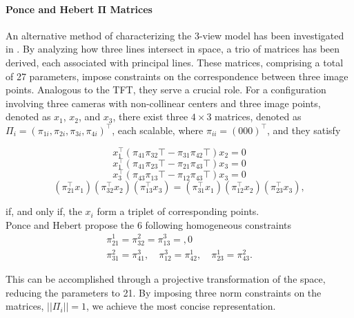 \paragraph{Ponce and Hebert \( \bm{\Pi} \) Matrices}
An alternative method of characterizing the 3-view model has been investigated in \cite{8-ponce-hebert-param}. By analyzing how three lines intersect in space, a trio of matrices has been derived, each associated with principal lines. These matrices, comprising a total of 27 parameters, impose constraints on the correspondence between three image points. Analogous to the TFT, they serve a crucial role. For a configuration involving three cameras with non-collinear centers and three image points, denoted as \( x_1 \), \( x_2 \), and \( x_3 \), there exist three \( 4 \times 3 \) matrices, denoted as \( \Pi_i = (\pi_{1i}, \pi_{2i}, \pi_{3i}, \pi_{4i})^\top \), each scalable, where \( \pi_{ii} = (0 0 0)^\top \), and they satisfy

\begin{equation}
	x_1^\top (\pi_{41}\pi_{32}\top - \pi_{31}\pi_{42}\top) x_2 = 0
	\label{eq:phConst1}
\end{equation}
\begin{equation}
	x_1^\top (\pi_{41}\pi_{23}\top - \pi_{21}\pi_{43}\top) x_3 = 0
	\label{eq:phConst2}
\end{equation}
\begin{equation}
	x_3^\top (\pi_{43}\pi_{13}\top - \pi_{12}\pi_{43}\top) x_3 = 0
	\label{eq:phConst3}
\end{equation}
\begin{equation}
	(\pi_{21}^\top x_1) (\pi_{32}^\top x_2) (\pi_{13}^\top x_3) = (\pi_{31}^\top x_1) (\pi_{12}^\top x_2) (\pi_{23}^\top x_3),
	\label{eq:phConst4}
\end{equation}

if, and only if, the \( x_i \) form a triplet of corresponding points.\\
Ponce and Hebert propose the 6 following homogeneous constraints
\begin{equation}
	\begin{gathered}
		\pi_{21}^1 = \pi_{32}^2 = \pi_{13}^3 = ,0\\
		\pi_{31}^2 = \pi_{41}^3, \quad \pi_{12}^3 = \pi_{42}^1, \quad \pi_{23}^1 = \pi_{43}^2.
	\end{gathered}
\end{equation}

This can be accomplished through a projective transformation of the space, reducing the parameters to 21. By imposing three norm constraints on the matrices, \( || \Pi_i || = 1 \), we achieve the most concise representation.\\

